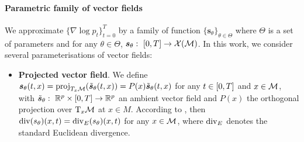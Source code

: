 \paragraph{Parametric family of vector fields}
We approximate $\{\nabla \log p_t\}_{t=0}^T$ by a
family of function $\{\bm{s}_\theta\}_{\theta \in \Theta}$ where $\Theta$ is a
set of parameters and for any $\theta \in \Theta$,
$\bm{s}_\theta: \ \left[0,T\right] \to \mathcal{X}(\mathcal{M})$. In this work, we consider several
parameterisations of vector fields:
%
\begin{itemize}
\item \textbf{Projected vector field}. We define
  $\bm{s}_\theta(t, x) = \text{proj}_{T_{x}\mathcal M}(\tilde{\bm{s}}_\theta(t, x)) = P(x)
  \tilde{\bm{s}}_\theta(t, x) $ for any $t \in \left[0,T\right]$ and $x \in \mathcal M$, with
  $\tilde{\bm{s}}_\theta: \ \mathbb{R}^p \times \left[0,T\right] \to \mathbb{R}^p$ an ambient vector
  field and $P(x)$ the orthogonal projection over $\mathrm{T}_x\mathcal M$ at $x \in M$.
  According to \citet[Lemma 2]{rozen2021moser}, then
  $\mathrm{div}(s_\theta)(x,t) = \mathrm{div}_E(s_\theta)(x,t)$ for any $x \in \mathcal M$, where
  $\mathrm{div}_E$ denotes the standard Euclidean divergence.
    


\end{itemize}
